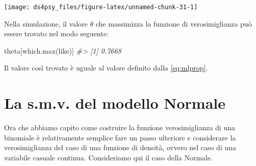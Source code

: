 \documentclass[
  11pt,
]{krantz}
\makeatletter
\newenvironment{Shaded}{\begin{snugshade}}{\end{snugshade}}
\newcommand{\CommentTok}[1]{\textcolor[rgb]{0.37,0.37,0.37}{\textit{#1}}}
\newcommand{\FunctionTok}[1]{\textcolor[rgb]{0,0,0}{#1}}
\newcommand{\NormalTok}[1]{#1}
\newenvironment{kframe}{%
\medskip{}
\setlength{\fboxsep}{.8em}
 \def\at@end@of@kframe{}%
 \ifinner\ifhmode%
  \def\at@end@of@kframe{\end{minipage}}%
  \begin{minipage}{\columnwidth}%
 \fi\fi%
 \def\FrameCommand##1{\hskip\@totalleftmargin \hskip-\fboxsep
 \colorbox{shadecolor}{##1}\hskip-\fboxsep
     \hskip-\linewidth \hskip-\@totalleftmargin \hskip\columnwidth}%
 \MakeFramed {\advance\hsize-\width
   \@totalleftmargin\z@ \linewidth\hsize
   \@setminipage}}%
 {\par\unskip\endMakeFramed%
 \at@end@of@kframe}
\renewenvironment{Shaded}{\begin{kframe}}{\end{kframe}}
\theoremstyle{definition}
\theoremstyle{definition}
\theoremstyle{definition}
\theoremstyle{definition}
\theoremstyle{remark}
\makeatother
\begin{document}
\begin{center}\texttt{[image: ds4psy\_files/figure-latex/unnamed-chunk-31-1]} \end{center}

Nella simulazione, il valore \(\theta\) che massimizza la funzione di verosimiglianza può essere trovato nel modo seguente:

\begin{Shaded}
\begin{Highlighting}[]
\NormalTok{theta[}\FunctionTok{which.max}\NormalTok{(like)]}
\CommentTok{\#\textgreater{} [1] 0.7668}
\end{Highlighting}
\end{Shaded}

Il valore così trovato è uguale al valore definito dalla \eqref{eq:mlprop}.

\hypertarget{derivation-smv-norm}{%
\section{La s.m.v. del modello Normale}\label{derivation-smv-norm}}

Ora che abbiamo capito come costruire la funzione verosimiglianza di una binomiale è relativamente semplice fare un passo ulteriore e considerare la verosimiglianza del caso di una funzione di densità, ovvero nel caso di una variabile casuale continua. Consideriamo qui il caso della Normale.
\end{document}

